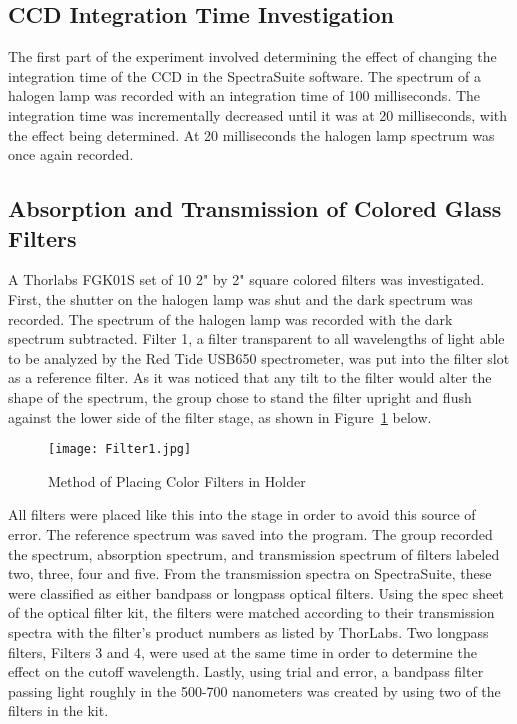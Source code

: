 \documentclass{article}
\begin{document}
\subsection{CCD Integration Time Investigation}
The first part of the experiment involved determining the effect of changing the integration time of the CCD in the SpectraSuite software. The spectrum of a halogen lamp was recorded with an integration time of 100 milliseconds. The integration time was incrementally decreased until it was at 20 milliseconds, with the effect being determined. At 20 milliseconds the halogen lamp spectrum was once again recorded. 


\subsection{Absorption and Transmission of Colored Glass Filters}
A Thorlabs FGK01S set of 10 2" by 2" square colored filters was investigated. First, the shutter on the halogen lamp was shut and the dark spectrum was recorded. The spectrum of the halogen lamp was recorded with the dark spectrum subtracted. Filter 1, a filter transparent to all wavelengths of light able to be analyzed by the Red Tide USB650 spectrometer, was put into the filter slot as a reference filter. As it was noticed that any tilt to the filter would alter the shape of the spectrum, the group chose to stand the filter upright and flush against the lower side of the filter stage, as shown in Figure~\ref{fig:colored filter} below.

\begin{figure} [h!]
    \centering
    \texttt{[image: Filter1.jpg]}
    \caption{Method of Placing Color Filters in Holder}
    \label{fig:colored filter}
\end{figure}

All filters were placed like this into the stage in order to avoid this source of error. The reference spectrum was saved into the program. The group recorded the spectrum, absorption spectrum, and transmission spectrum of filters labeled two, three, four and five. From the transmission spectra on SpectraSuite, these were classified as either bandpass or longpass optical filters. Using the spec sheet of the optical filter kit, the filters were matched according to their transmission spectra with the filter's product numbers as listed by ThorLabs. Two longpass filters, Filters 3 and 4, were used at the same time in order to determine the effect on the cutoff wavelength. Lastly, using trial and error, a bandpass filter passing light roughly in the 500-700 nanometers was created by using two of the filters in the kit. 
\end{document}
